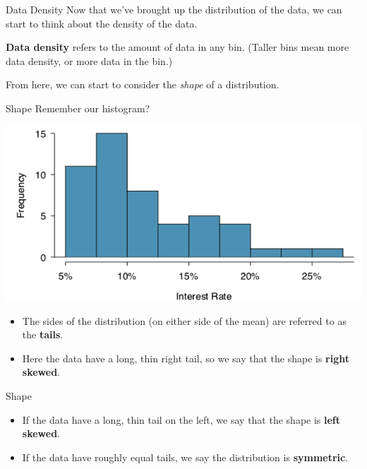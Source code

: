 \begin{frame}{Data Density}
    Now that we've brought up the distribution of the data, we can start to think about the density of the data.
    
    \vspace{12pt}\textbf{Data density} refers to the amount of data in any bin. (Taller bins mean more data density, or more data in the bin.)
    
    \vspace{12pt}From here, we can start to consider the \textit{shape} of a distribution. 
\end{frame}

\begin{frame}{Shape}
    Remember our histogram?
    
    \begin{center}
        \includegraphics[scale=0.3]{images/hist2.png}
    \end{center}
    
    \begin{itemize}
        \item The sides of the distribution (on either side of the mean) are referred to as the \textbf{tails}. 
        \item Here the data have a long, thin right tail, so we say that the shape is \textbf{right skewed}. 
    \end{itemize}
\end{frame}

\begin{frame}{Shape}
    \begin{itemize}
        \item If the data have a long, thin tail on the left, we say that the shape is \textbf{left skewed}.
        \item If the data have roughly equal tails, we say the distribution is \textbf{symmetric}. 
    \end{itemize}
\end{frame}

